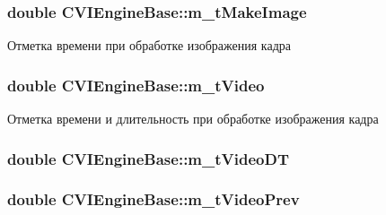 \hypertarget{class_c_v_i_engine_base_a0e3c27e7d2ed527eca5445a669080838}{
\subsubsection[{m\+\_\+t\+Make\+Image}]{\setlength{\rightskip}{0pt plus 5cm}double C\+V\+I\+Engine\+Base\+::m\+\_\+t\+Make\+Image}}\label{class_c_v_i_engine_base_a0e3c27e7d2ed527eca5445a669080838}


Отметка времени при обработке изображения кадра 

\hypertarget{class_c_v_i_engine_base_a0d6409bd350e84190cd6904732c4fe83}{
\subsubsection[{m\+\_\+t\+Video}]{\setlength{\rightskip}{0pt plus 5cm}double C\+V\+I\+Engine\+Base\+::m\+\_\+t\+Video}}\label{class_c_v_i_engine_base_a0d6409bd350e84190cd6904732c4fe83}


Отметка времени и длительность при обработке изображения кадра 

\hypertarget{class_c_v_i_engine_base_a0bbf6f3d2d6b80fec8d223ffb44a6791}{
\subsubsection[{m\+\_\+t\+Video\+D\+T}]{\setlength{\rightskip}{0pt plus 5cm}double C\+V\+I\+Engine\+Base\+::m\+\_\+t\+Video\+D\+T}}\label{class_c_v_i_engine_base_a0bbf6f3d2d6b80fec8d223ffb44a6791}




\hypertarget{class_c_v_i_engine_base_a45286d497ebc137775cda4999ff9fed6}{
\subsubsection[{m\+\_\+t\+Video\+Prev}]{\setlength{\rightskip}{0pt plus 5cm}double C\+V\+I\+Engine\+Base\+::m\+\_\+t\+Video\+Prev}}\label{class_c_v_i_engine_base_a45286d497ebc137775cda4999ff9fed6}


